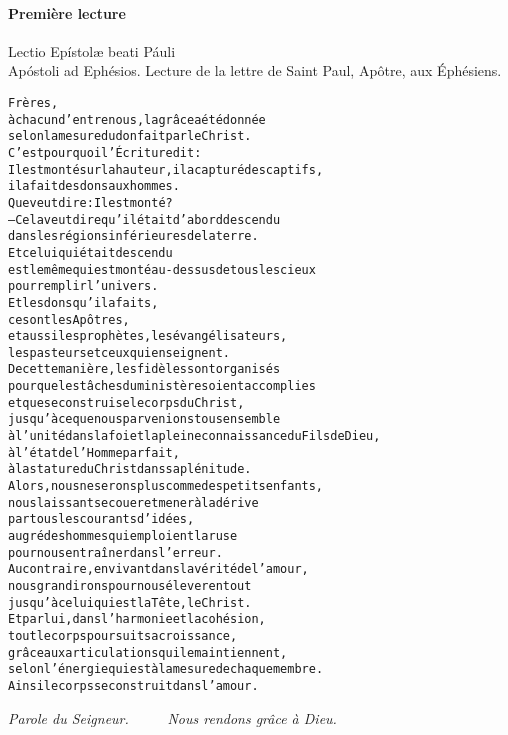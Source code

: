 \documentclass[twoside]{article}
\begin{document}
\paragraph{Première lecture}

\begin{paracol}{2}
Lectio Epístolæ beati Páuli \\ Apóstoli ad Ephésios.
\switchcolumn
Lecture de la lettre de Saint Paul, Apôtre, aux Éphésiens.
\end{paracol}
\begin{alltt}\normalfont
    Frères,
        à chacun d’entre nous, la grâce a été donnée
        selon la mesure du don fait par le Christ.
    C’est pourquoi l’Écriture dit :
        Il est monté sur la hauteur, il a capturé des captifs,
        il a fait des dons aux hommes.
    Que veut dire : Il est monté ?
    – Cela veut dire qu’il était d’abord descendu
        dans les régions inférieures de la terre.
        Et celui qui était descendu
        est le même qui est monté au-dessus de tous les cieux
        pour remplir l’univers.
    Et les dons qu’il a faits,
        ce sont les Apôtres,
        et aussi les prophètes, les évangélisateurs,
        les pasteurs et ceux qui enseignent.
    De cette manière, les fidèles sont organisés
        pour que les tâches du ministère soient accomplies
        et que se construise le corps du Christ,
        jusqu’à ce que nous parvenions tous ensemble
            à l’unité dans la foi et la pleine connaissance du Fils de Dieu,
            à l’état de l’Homme parfait,
            à la stature du Christ dans sa plénitude.
    Alors, nous ne serons plus comme des petits enfants,
        nous laissant secouer et mener à la dérive
        par tous les courants d’idées,
        au gré des hommes qui emploient la ruse
        pour nous entraîner dans l’erreur.
    Au contraire, en vivant dans la vérité de l’amour,
        nous grandirons pour nous élever en tout
        jusqu’à celui qui est la Tête, le Christ.
    Et par lui, dans l’harmonie et la cohésion,
        tout le corps poursuit sa croissance,
        grâce aux articulations qui le maintiennent,
        selon l’énergie qui est à la mesure de chaque membre.
    Ainsi le corps se construit dans l’amour.
\end{alltt}


\emph{\vv Parole du Seigneur. ~~~~ \rr Nous rendons grâce à Dieu.}

\end{document}
